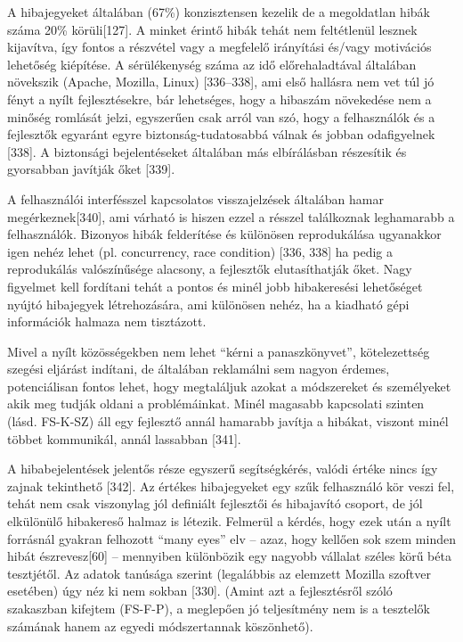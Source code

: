 \documentclass[12pt,magyar,a4paper,oneside]{scrreprt}
\begin{document}
A hibajegyeket általában (67\%) konzisztensen kezelik de a megoldatlan
hibák száma 20\% körüli{[}127{]}. A minket érintő hibák tehát nem
feltétlenül lesznek kijavítva, így fontos a részvétel vagy a megfelelő
irányítási és/vagy motivációs lehetőség kiépítése. A sérülékenység száma
az idő előrehaladtával általában növekszik (Apache, Mozilla, Linux)
{[}336--338{]}, ami első hallásra nem vet túl jó fényt a nyílt
fejlesztésekre, bár lehetséges, hogy a hibaszám növekedése nem a minőség
romlását jelzi, egyszerűen csak arról van szó, hogy a felhasználók és a
fejlesztők egyaránt egyre biztonság-tudatosabbá válnak és jobban
odafigyelnek {[}338{]}. A biztonsági bejelentéseket általában más
elbírálásban részesítik és gyorsabban javítják őket {[}339{]}.

A felhasználói interfésszel kapcsolatos visszajelzések általában hamar
megérkeznek{[}340{]}, ami várható is hiszen ezzel a résszel találkoznak
leghamarabb a felhasználók. Bizonyos hibák felderítése és különösen
reprodukálása ugyanakkor igen nehéz lehet (pl. concurrency, race
condition) {[}336, 338{]} ha pedig a reprodukálás valószínűsége
alacsony, a fejlesztők elutasíthatják őket. Nagy figyelmet kell
fordítani tehát a pontos és minél jobb hibakeresési lehetőséget nyújtó
hibajegyek létrehozására, ami különösen nehéz, ha a kiadható gépi
információk halmaza nem tisztázott.

Mivel a nyílt közösségekben nem lehet ``kérni a panaszkönyvet'',
kötelezettség szegési eljárást indítani, de általában reklamálni sem
nagyon érdemes, potenciálisan fontos lehet, hogy megtaláljuk azokat a
módszereket és személyeket akik meg tudják oldani a problémáinkat. Minél
magasabb kapcsolati szinten (lásd. FS-K-SZ) áll egy fejlesztő annál
hamarabb javítja a hibákat, viszont minél többet kommunikál, annál
lassabban {[}341{]}.

A hibabejelentések jelentős része egyszerű segítségkérés, valódi értéke
nincs így zajnak tekinthető {[}342{]}. Az értékes hibajegyeket egy szűk
felhasználó kör veszi fel, tehát nem csak viszonylag jól definiált
fejlesztői és hibajavító csoport, de jól elkülönülő hibakereső halmaz is
létezik. Felmerül a kérdés, hogy ezek után a nyílt forrásnál gyakran
felhozott ``many eyes'' elv -- azaz, hogy kellően sok szem minden hibát
észrevesz{[}60{]} -- mennyiben különbözik egy nagyobb vállalat széles
körű béta tesztjétől. Az adatok tanúsága szerint (legalábbis az elemzett
Mozilla szoftver esetében) úgy néz ki nem sokban {[}330{]}. (Amint azt a
fejlesztésről szóló szakaszban kifejtem (FS-F-P), a meglepően jó
teljesítmény nem is a tesztelők számának hanem az egyedi módszertannak
köszönhető).
\end{document}
